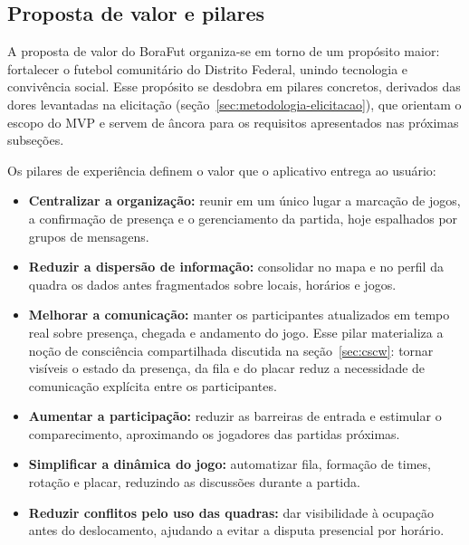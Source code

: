     \subsection{Proposta de valor e pilares}
      \label{subsec:proposta-valor}
      A proposta de valor do BoraFut organiza-se em torno de um propósito maior: fortalecer o futebol comunitário do Distrito Federal, unindo tecnologia e convivência social. Esse propósito se desdobra em pilares concretos, derivados das dores levantadas na elicitação (seção~\ref{sec:metodologia-elicitacao}), que orientam o escopo do MVP e servem de âncora para os requisitos apresentados nas próximas subseções.

      Os pilares de experiência definem o valor que o aplicativo entrega ao usuário:

      \begin{itemize}
          \item \textbf{Centralizar a organização:} reunir em um único lugar a marcação de jogos, a confirmação de presença e o gerenciamento da partida, hoje espalhados por grupos de mensagens.

          \item \textbf{Reduzir a dispersão de informação:} consolidar no mapa e no perfil da quadra os dados antes fragmentados sobre locais, horários e jogos.

          \item \textbf{Melhorar a comunicação:} manter os participantes atualizados em tempo real sobre presença, chegada e andamento do jogo. Esse pilar materializa a noção de consciência compartilhada discutida na seção~\ref{sec:cscw}: tornar visíveis o estado da presença, da fila e do placar reduz a necessidade de comunicação explícita entre os participantes.

          \item \textbf{Aumentar a participação:} reduzir as barreiras de entrada e estimular o comparecimento, aproximando os jogadores das partidas próximas.

          \item \textbf{Simplificar a dinâmica do jogo:} automatizar fila, formação de times, rotação e placar, reduzindo as discussões durante a partida.

          \item \textbf{Reduzir conflitos pelo uso das quadras:} dar visibilidade à ocupação antes do deslocamento, ajudando a evitar a disputa presencial por horário.
      \end{itemize}

